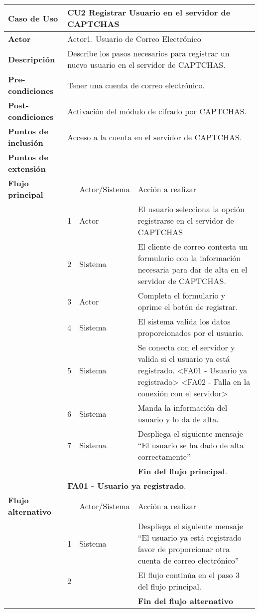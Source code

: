 \documentclass[12pt,oneside,onecolumn,openany]{report}
\begin{document}
 \begin{longtable}[H]{| p{} | p{} |p{4cm}|p{5cm}|}%
     \hline
     \textbf{Caso de Uso} &\multicolumn{3}{|l|}{CU2 Registrar Usuario en el servidor de CAPTCHAS}\\
     \hline
     \textbf{Actor} & \multicolumn{3}{|l|}{Actor1. Usuario de Correo Electrónico}\\
     \hline
     \textbf{Descripción} & \multicolumn{3}{|p{10cm}|}{Describe los pasos necesarios para registrar un nuevo usuario en el servidor de CAPTCHAS.}\\
     \hline
     \textbf{Pre-condiciones} & \multicolumn{3}{|l|}{Tener una cuenta de correo electrónico.}\\
     \hline
     \textbf{Post-condiciones} & \multicolumn{3}{|l|}{Activación del módulo de cifrado por CAPTCHAS.}\\
     \hline
     \textbf{Puntos de inclusión} & \multicolumn{3}{|l|}{Acceso a la cuenta en el servidor de CAPTCHAS.}\\
     \hline
     \textbf{Puntos de extensión} & \multicolumn{3}{|l|}{}\\
     \hline
     \textbf{Flujo principal} & & Actor/Sistema & Acción a realizar\\
     \hline
     & 1 & Actor & El usuario selecciona la opción registrarse en el servidor de CAPTCHAS\\
     \hline
     & 2 & Sistema & El cliente de correo contesta un formulario con la información necesaria para dar de alta en el servidor de CAPTCHAS.\\
     \hline
     & 3 & Actor & Completa el formulario y oprime el botón de registrar.\\
     \hline
     & 4 & Sistema & El sistema valida los datos proporcionados por el usuario.\\
     \hline
     & 5 & Sistema & Se conecta con el servidor y valida si el usuario ya está registrado. <FA01 - Usuario ya registrado> <FA02 - Falla en la conexión con el servidor>\\
     \hline
     & 6 & Sistema & Manda la información del usuario y lo da de alta.\\
     \hline
     & 7 & Sistema & Despliega el siguiente mensaje ``El usuario se ha dado de alta correctamente''\\
     \hline
     & & & \textbf{Fin del flujo principal}.\\
     \hline
     & \multicolumn{3}{|l|}{\textbf{FA01 - Usuario ya registrado}.}\\
     \hline
     \textbf{Flujo alternativo} & & Actor/Sistema & Acción a realizar\\
     \hline
     & 1 & Sistema & Despliega el siguiente mensaje  ``El usuario ya está registrado favor de proporcionar otra cuenta de correo electrónico''\\
     \hline
     & 2 & & El flujo continúa en el paso 3 del flujo principal.\\
     \hline
     &  & & \textbf{Fin del flujo alternativo}\\
     \hline
     

\end{longtable}
\end{document}

